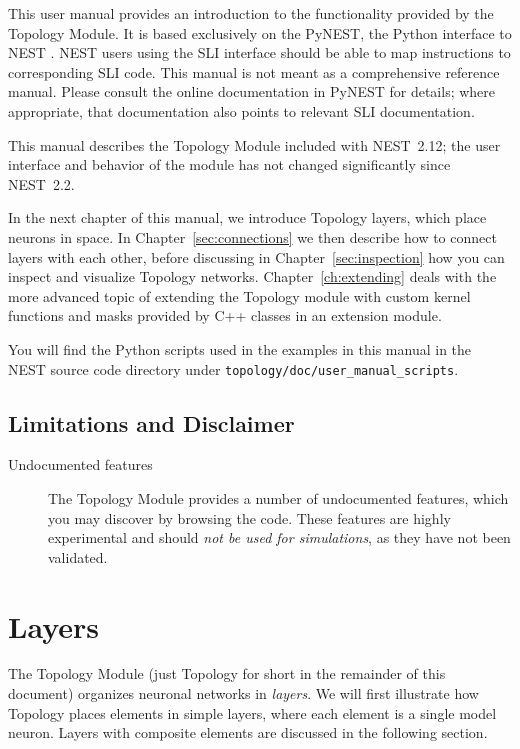 \documentclass[a4paper,12pt]{report}
\begin{document}
This user manual provides an introduction to the functionality
provided by the Topology Module. It is based exclusively on the
PyNEST, the Python interface to NEST \citep{Eppl:2008(12)}. NEST users
using the SLI interface should be able to map instructions to
corresponding SLI code. This manual is not meant as a comprehensive
reference manual. Please consult the online documentation in PyNEST
for details; where appropriate, that documentation also points to
relevant SLI documentation.

This manual describes the Topology Module included with NEST~2.12;
the user interface and behavior of the module has not changed
significantly since NEST~2.2.

In the next chapter of this manual, we introduce Topology layers,
which place neurons in space. In Chapter~\ref{sec:connections} we then
describe how to connect layers with each other, before discussing in
Chapter~\ref{sec:inspection} how you can inspect and visualize
Topology networks. Chapter~\ref{ch:extending} deals with the more advanced
topic of extending the Topology module with custom kernel functions and
masks provided by C++ classes in an extension module.

You will find the Python scripts used in the examples in this manual
 in the NEST
source code directory under \lstinline!topology/doc/user_manual_scripts!.

\section{Limitations and Disclaimer}\label{sec:limitations}

\begin{description}
\item[Undocumented features] The Topology Module provides a number of undocumented features, which
you may discover by browsing the code. These features are highly
experimental and should \emph{not be used for simulations}, as they
have not been validated.
\end{description}




\chapter{Layers}\label{sec:layers}

The Topology Module (just Topology for short in the remainder of this
document) organizes neuronal networks in \emph{layers}. We will first
illustrate how Topology places elements in simple layers, where each
element is a single model neuron. Layers with composite elements are
discussed in the following section.
\end{document}

